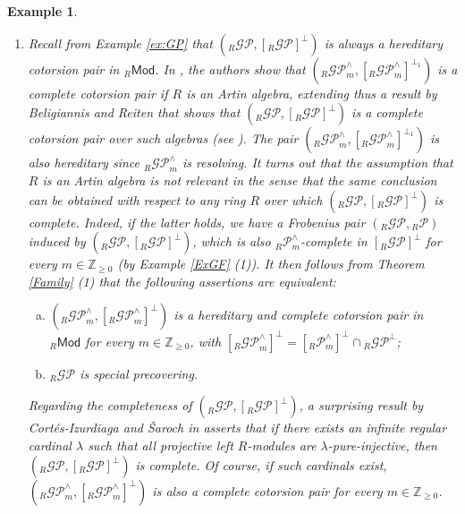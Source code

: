 \documentclass[10pt,reqno]{amsart}
\numberwithin{equation}{section}
\newtheorem{example}[definition]{Example}
\theoremstyle{remark}
\begin{document}
\begin{example}\label{ex:PGF} ~\
\begin{enumerate}[(1)]
\item Recall from Example \ref{ex:GP} that $({}_R\mathcal{GP},[{}_R\mathcal{GP}]^\perp)$ is always a hereditary cotorsion pair in ${}_R\mathsf{Mod}$. In \cite[Thm. 3.4]{Chains}, the authors show that $({}_R\mathcal{GP}^\wedge_m,[{}_R\mathcal{GP}^\wedge_m]^{\perp_1})$ is a complete cotorsion pair if $R$ is an Artin algebra, extending thus a result by Beligiannis and Reiten that shows that $({}_R\mathcal{GP},[{}_R\mathcal{GP}]^\perp)$ is a complete cotorsion pair over such algebras (see \cite[Thm. X.2.4.]{BeligiannisReiten}). The pair $({}_R\mathcal{GP}^\wedge_m,[{}_R\mathcal{GP}^\wedge_m]^{\perp_1})$ is also hereditary since ${}_R\mathcal{GP}^\wedge_m$ is resolving. It turns out that the assumption that $R$ is an Artin algebra is not relevant in the sense that the same conclusion can be obtained with respect to any ring $R$ over which $({}_R\mathcal{GP},[{}_R\mathcal{GP}]^\perp)$ is complete. Indeed, if the latter holds, we have a Frobenius pair $({}_R\mathcal{GP},{}_R\mathcal{P})$ induced by $({}_R\mathcal{GP},[{}_R\mathcal{GP}]^\perp)$, which is also ${}_R\mathcal{P}^\wedge_m$-complete in $[{}_R\mathcal{GP}]^\perp$ for every $m \in \mathbb{Z}_{\geq 0}$ (by Example \ref{ExGF} (1)). It then follows from Theorem \ref{Family} (1) that the following assertions are equivalent:
\begin{enumerate}[(a)] 
\item $({}_R\mathcal{GP}^\wedge_m,[{}_R\mathcal{GP}^\wedge_m]^{\perp})$ is a hereditary and complete cotorsion pair in ${}_R\mathsf{Mod}$ for every $m \in \mathbb{Z}_{\geq 0}$, with $[{}_R\mathcal{GP}^\wedge_m]^{\perp} = [{}_R\mathcal{P}^\wedge_m]^{\perp} \cap {}_R\mathcal{GP}^{\perp}$; 

\item ${}_R\mathcal{GP}$ is special precovering. 
\end{enumerate}

Regarding the completeness of $({}_R\mathcal{GP},[{}_R\mathcal{GP}]^\perp)$, a surprising result by Cortés-Izurdiaga and \v{S}aroch in \cite[Thm. 5.2]{Cortes} asserts that if there exists an infinite regular cardinal $\lambda$ such that all projective left $R$-modules are $\lambda$-pure-injective, then $({}_R\mathcal{GP},[{}_R\mathcal{GP}]^\perp)$ is complete. Of course, if such cardinals exist, $({}_R\mathcal{GP}^\wedge_m,[{}_R\mathcal{GP}^\wedge_m]^\perp)$ is also a complete cotorsion pair for every $m \in \mathbb{Z}_{\geq 0}$.


\end{enumerate}
\end{example}
\end{document}
